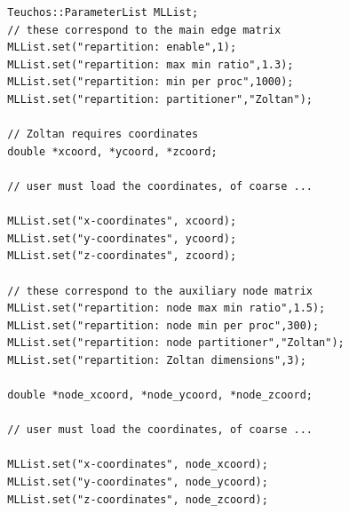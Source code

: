 \documentclass{article}[11pt]
\begin{document}
\begin{verbatim}
  Teuchos::ParameterList MLList;
  // these correspond to the main edge matrix
  MLList.set("repartition: enable",1);
  MLList.set("repartition: max min ratio",1.3);
  MLList.set("repartition: min per proc",1000);
  MLList.set("repartition: partitioner","Zoltan");

  // Zoltan requires coordinates
  double *xcoord, *ycoord, *zcoord;

  // user must load the coordinates, of coarse ...

  MLList.set("x-coordinates", xcoord); 
  MLList.set("y-coordinates", ycoord); 
  MLList.set("z-coordinates", zcoord); 

  // these correspond to the auxiliary node matrix
  MLList.set("repartition: node max min ratio",1.5);
  MLList.set("repartition: node min per proc",300);
  MLList.set("repartition: node partitioner","Zoltan");
  MLList.set("repartition: Zoltan dimensions",3);

  double *node_xcoord, *node_ycoord, *node_zcoord;

  // user must load the coordinates, of coarse ...

  MLList.set("x-coordinates", node_xcoord); 
  MLList.set("y-coordinates", node_ycoord); 
  MLList.set("z-coordinates", node_zcoord); 

\end{verbatim}


%
\end{document}
